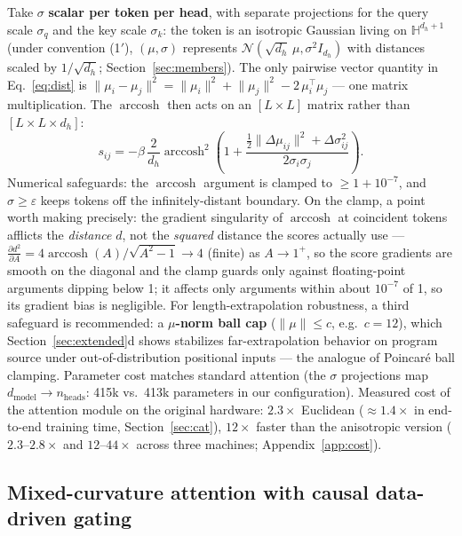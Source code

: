 \documentclass[11pt]{article}
\DeclareMathOperator{\arccosh}{arccosh}
\begin{document}
Take $\sigma$ \textbf{scalar per token per head}, with separate projections for the query scale $\sigma_q$ and the key scale $\sigma_k$: the token is an isotropic Gaussian living on $\mathbb{H}^{d_h+1}$ (under convention (1$'$), $(\mu, \sigma)$ represents $\mathcal{N}(\sqrt{d_h}\,\mu, \sigma^2 I_{d_h})$ with distances scaled by $1/\sqrt{d_h}$; Section~\ref{sec:members}). The only pairwise vector quantity in Eq.~\eqref{eq:dist} is $\lVert \mu_i - \mu_j \rVert^2 = \lVert\mu_i\rVert^2 + \lVert\mu_j\rVert^2 - 2\,\mu_i^{\top}\mu_j$ --- one matrix multiplication. The $\arccosh$ then acts on an $[L \times L]$ matrix rather than $[L \times L \times d_h]$:
\begin{equation*}
s_{ij} = -\beta\, \frac{2}{d_h} \arccosh^2\!\left(1 + \frac{\tfrac{1}{2}\lVert\Delta\mu_{ij}\rVert^2 + \Delta\sigma_{ij}^2}{2 \sigma_i \sigma_j}\right).
\end{equation*}
Numerical safeguards: the $\arccosh$ argument is clamped to $\ge 1 + 10^{-7}$, and $\sigma \ge \varepsilon$ keeps tokens off the infinitely-distant boundary. On the clamp, a point worth making precisely: the gradient singularity of $\arccosh$ at coincident tokens afflicts the \emph{distance} $d$, not the \emph{squared} distance the scores actually use --- $\frac{\partial d^2}{\partial A} = 4\arccosh(A)/\sqrt{A^2-1} \to 4$ (finite) as $A \to 1^+$, so the score gradients are smooth on the diagonal and the clamp guards only against floating-point arguments dipping below 1; it affects only arguments within about $10^{-7}$ of 1, so its gradient bias is negligible. For length-extrapolation robustness, a third safeguard is recommended: a \textbf{$\mu$-norm ball cap} ($\lVert\mu\rVert \le c$, e.g.\ $c = 12$), which Section~\ref{sec:extended}d shows stabilizes far-extrapolation behavior on program source under out-of-distribution positional inputs --- the analogue of Poincar\'e ball clamping. Parameter cost matches standard attention (the $\sigma$ projections map $d_{\mathrm{model}} \to n_{\mathrm{heads}}$: 415k vs.\ 413k parameters in our configuration). Measured cost of the attention module on the original hardware: $2.3\times$ Euclidean ($\approx 1.4\times$ in end-to-end training time, Section~\ref{sec:cat}), $12\times$ faster than the anisotropic version ($2.3$--$2.8\times$ and $12$--$44\times$ across three machines; Appendix~\ref{app:cost}).

\subsection{Mixed-curvature attention with causal data-driven gating}\label{sec:mixed}
\end{document}
